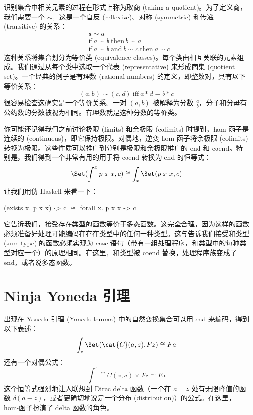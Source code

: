 识别集合中相关元素的过程在形式上称为取商 (taking a quotient)。为了定义商，我们需要一个  $\sim$，这是一个自反 (reflexive)、对称 (symmetric) 和传递 (transitive) 的关系：
\begin{align*}
   & a \sim a                                                         \\
   & \text{if}\ a \sim b\ \text{then}\ b \sim a                       \\
   & \text{if}\ a \sim b\ \text{and}\ b \sim c\ \text{then}\ a \sim c
\end{align*}
这种关系将集合划分为等价类 (equivalence classes)。每个类由相互关联的元素组成。我们通过从每个类中选取一个代表 (representative) 来形成商集 (quotient set)。一个经典的例子是有理数 (rational numbers) 的定义，即整数对，具有以下等价关系：
\[(a, b) \sim (c, d)\ \text{iff}\ a * d = b * c\]
很容易检查这确实是一个等价关系。一对 $(a, b)$ 被解释为分数 $\frac{a}{b}$，分子和分母有公约数的分数被视为相同。有理数就是这种分数的等价类。

你可能还记得我们之前讨论极限 (limits) 和余极限 (colimits) 时提到，hom-函子是连续的 (continuous)，即它保持极限。对偶地，逆变 hom-函子将余极限 (colimits) 转换为极限。这些性质可以推广到分别是极限和余极限推广的 end 和 coend。特别是，我们得到一个非常有用的用于将 coend 转换为 end 的恒等式：
\[\Set(\int^x p\ x\ x, c) \cong \int_x \Set(p\ x\ x, c)\]
让我们用伪 Haskell 来看一下：

\begin{snipv}
(exists x. p x x) -> c \ensuremath{\cong} forall x. p x x -> c
\end{snipv}
它告诉我们，接受存在类型的函数等价于多态函数。这完全合理，因为这样的函数必须准备好处理可能编码在存在类型中的任何一种类型。这与告诉我们接受和类型 (sum type) 的函数必须实现为 case 语句（带有一组处理程序，和类型中的每种类型对应一个）的原理相同。在这里，和类型被 coend 替换，处理程序族变成了 end，或者说多态函数。

\section{Ninja Yoneda 引理}

出现在 Yoneda 引理 (Yoneda lemma) 中的自然变换集合可以用 end 来编码，得到以下表述：
\[\int_z \Set(\cat{C}(a, z), F z) \cong F a\]
还有一个对偶公式：
\[\int^z \cat{C}(z, a)\times{}F z \cong F a\]
这个恒等式强烈地让人联想到 Dirac delta 函数（一个在 $a=z$ 处有无限峰值的函数 $\delta(a - z)$，或者更确切地说是一个分布 (distribution)）的公式。在这里，hom-函子扮演了 delta 函数的角色。

